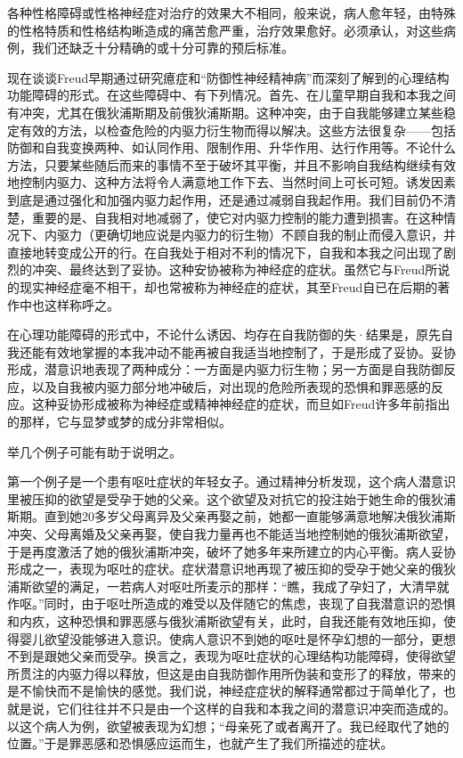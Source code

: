 \documentclass[UTF8,10pt,a4paper,openany]{book}
\begin{document}
各种性格障碍或性格神经症对治疗的效果大不相同，般来说，病人愈年轻，由特殊的性格特质和性格结构晰造成的痛苦愈严重，治疗效果愈好。必须承认，对这些病例，我们还缺乏十分精确的或十分可靠的预后标准。

现在谈谈Freud早期通过研究癔症和“防御性神经精神病”而深刻了解到的心理结构功能障碍的形式。在这些障碍中、有下列情况。首先、在儿童早期自我和本我之间有冲突，尤其在俄狄浦斯期及前俄狄浦斯期。这种冲突，由于自我能够建立某些稳定有效的方法，以检查危险的内驱力衍生物而得以解决。这些方法很复杂——包括防御和自我变换两种、如认同作用、限制作用、升华作用、达行作用等。不论什么方法，只要某些随后而来的事情不至于破坏其平衡，并且不影响自我结构继续有效地控制内驱力、这种方法将令人满意地工作下去、当然时间上可长可短。诱发因素到底是通过强化和加强内驱力起作用，还是通过减弱自我起作用。我们目前仍不清楚，重要的是、自我相对地减弱了，使它对内驱力控制的能力遭到损害。在这种情况下、内驱力（更确切地应说是内驱力的衍生物）不顾自我的制止而侵入意识，并直接地转变成公开的行。在自我处于相对不利的情况下，自我和本我之问出现了剧烈的冲突、最终达到了妥协。这种安协被称为神经症的症状。虽然它与Freud所说的现实神经症毫不相干，却也常被称为神经症的症状，其至Freud自已在后期的著作中也这样称呼之。

在心理功能障碍的形式中，不论什么诱因、均存在自我防御的失·结果是，原先自我还能有效地掌握的本我冲动不能再被自我适当地控制了，于是形成了妥协。妥协形成，潜意识地表现了两种成分：一方面是内驱力衍生物；另一方面是自我防御反应，以及自我被内驱力部分地冲破后，对出现的危险所表现的恐惧和罪恶感的反应。这种妥协形成被称为神经症或精神神经症的症状，而旦如Freud许多年前指出的那样，它与显梦或梦的成分非常相似。

举几个例子可能有助于说明之。

第一个例子是一个患有呕吐症状的年轻女子。通过精神分析发现，这个病人潜意识里被压抑的欲望是受孕于她的父亲。这个欲望及对抗它的投注始于她生命的俄狄浦斯期。直到她20多岁父母离异及父亲再娶之前，她都一直能够满意地解决俄狄浦斯冲突、父母离婚及父亲再娶，使自我力量再也不能适当地控制她的俄狄浦斯欲望，于是再度激活了她的俄狄浦斯冲突，破坏了她多年来所建立的内心平衡。病人妥协形成之一，表现为呕吐的症状。症状潜意识地再现了被压抑的受孕于她父亲的俄狄浦斯欲望的满足，一若病人对呕吐所麦示的那样：“瞧，我成了孕妇了，大清早就作呕。”同时，由于呕吐所造成的难受以及伴随它的焦虑，丧现了自我潜意识的恐惧和内疚，这种恐惧和罪恶感与俄狄浦斯欲望有关，此时，自我还能有效地压抑，使得婴儿欲望没能够进入意识。使病人意识不到她的呕吐是怀孕幻想的一部分，更想不到是跟她父亲而受孕。换言之，表现为呕吐症状的心理结构功能障碍，使得欲望所贯注的内驱力得以释放，但这是由自我防御作用所伪装和变形了的释放，带来的是不愉快而不是愉快的感觉。我们说，神经症症状的解释通常都过于简单化了，也就是说，它们往往并不只是由一个这样的自我和本我之间的潜意识冲突而造成的。以这个病人为例，欲望被表现为幻想；“母亲死了或者离开了。我已经取代了她的位置。”于是罪恶感和恐惧感应运而生，也就产生了我们所描述的症状。
\end{document}
